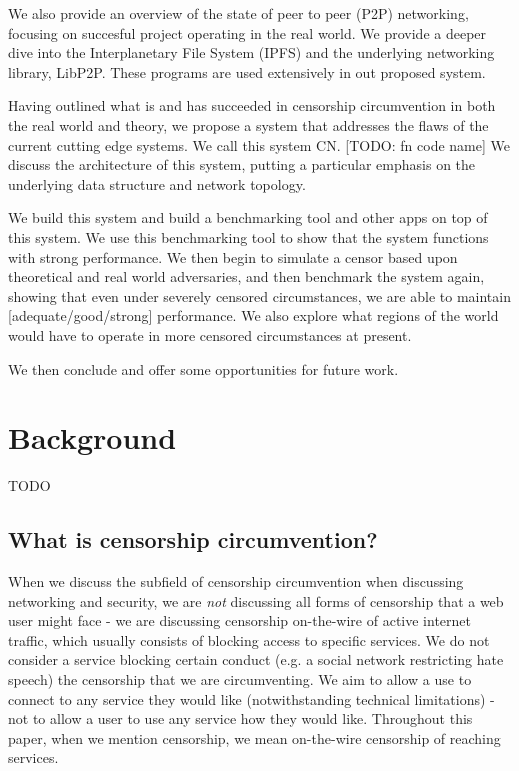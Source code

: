 \documentclass[12pt]{report}
\begin{document}
We also provide an overview of the state of peer to peer (P2P) networking, focusing on succesful project operating in the real world. We provide a deeper dive into the Interplanetary File System (IPFS) and the underlying networking library, LibP2P. These programs are used extensively in out proposed system.

Having outlined what is and has succeeded in censorship circumvention in both the real world and theory, we propose a system that addresses the flaws of the current cutting edge systems. We call this system CN. [TODO: fn code name] We discuss the architecture of this system, putting a particular emphasis on the underlying data structure and network topology.

We build this system and build a benchmarking tool and other apps on top of this system. We use this benchmarking tool to show that the system functions with strong performance. We then begin to simulate a censor based upon theoretical and real world adversaries, and then benchmark the system again, showing that even under severely censored circumstances, we are able to maintain [adequate/good/strong] performance. We also explore what regions of the world would have to operate in more censored circumstances at present.

We then conclude and offer some opportunities for future work.

\chapter{Background}

TODO

\section{What is censorship circumvention?}

When we discuss the subfield of censorship circumvention when discussing networking and security, we are \emph{not} discussing all forms of censorship that a web user might face - we are discussing censorship on-the-wire of active internet traffic, which usually consists of blocking access to specific services. We do not consider a service blocking certain conduct (e.g. a social network restricting hate speech) the censorship that we are circumventing. We aim to allow a use to connect to any service they would like (notwithstanding technical limitations) - not to allow a user to use any service how they would like. Throughout this paper, when we mention censorship, we mean on-the-wire censorship of reaching services.
\end{document}
